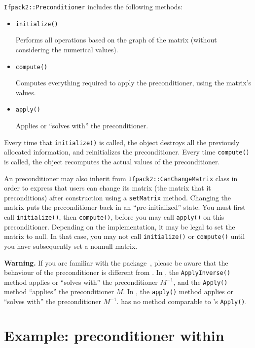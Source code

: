 \texttt{Ifpack2::Preconditioner} includes the following methods:
\begin{itemize}
  \item \texttt{initialize()}

    Performs all operations based on the graph of the matrix (without
    considering the numerical values).

  \item \texttt{compute()}

    Computes everything required to apply the preconditioner, using the matrix's
    values.

  \item \texttt{apply()}

    Applies or ``solves with'' the preconditioner.
\end{itemize}
Every time that \texttt{initialize()} is called, the object destroys all the
previously allocated information, and reinitializes the preconditioner. Every
time \texttt{compute()} is called, the object recomputes the actual values of the
preconditioner.

An \ifpacktwo preconditioner may also inherit from
\texttt{Ifpack2::CanChangeMatrix} class in order to express that users can
change its matrix (the matrix that it preconditions) after construction using a
\texttt{setMatrix} method.  Changing the matrix puts the preconditioner back in
an ``pre-initialized'' state.  You must first call \texttt{initialize()}, then
\texttt{compute()}, before you may call \texttt{apply()} on this preconditioner.
Depending on the implementation, it may be legal to set the matrix to null. In
that case, you may not call \texttt{initialize()} or \texttt{compute()} until
you have subsequently set a nonnull matrix.

\textbf{Warning.} If you are familiar with the \ifpack package~\cite{ifpack}, please be aware
that the behaviour of the \ifpacktwo preconditioner is different from \ifpack.
In \ifpack, the \texttt{ApplyInverse()} method applies or ``solves with'' the
preconditioner $M^{-1}$, and the \texttt{Apply()} method ``applies'' the
preconditioner $M$. In \ifpacktwo, the \texttt{apply()} method applies or
``solves with'' the preconditioner $M^{-1}$. \ifpacktwo has no method comparable
to \ifpack's \texttt{Apply()}.

\section{Example: \ifpacktwo preconditioner within \belos}\label{sec:examples in code}

